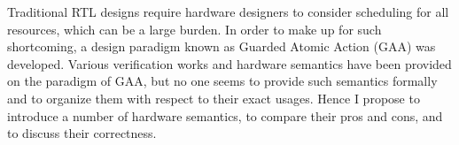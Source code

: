 % 
% 
%

Traditional RTL designs require hardware designers to consider
scheduling for all resources, which can be a large burden. In order to
make up for such shortcoming, a design paradigm known as Guarded
Atomic Action (GAA) was developed. Various verification works and
hardware semantics have been provided on the paradigm of GAA, but no
one seems to provide such semantics formally and to organize them with
respect to their exact usages. Hence I propose to introduce a number
of hardware semantics, to compare their pros and cons, and to discuss
their correctness.
